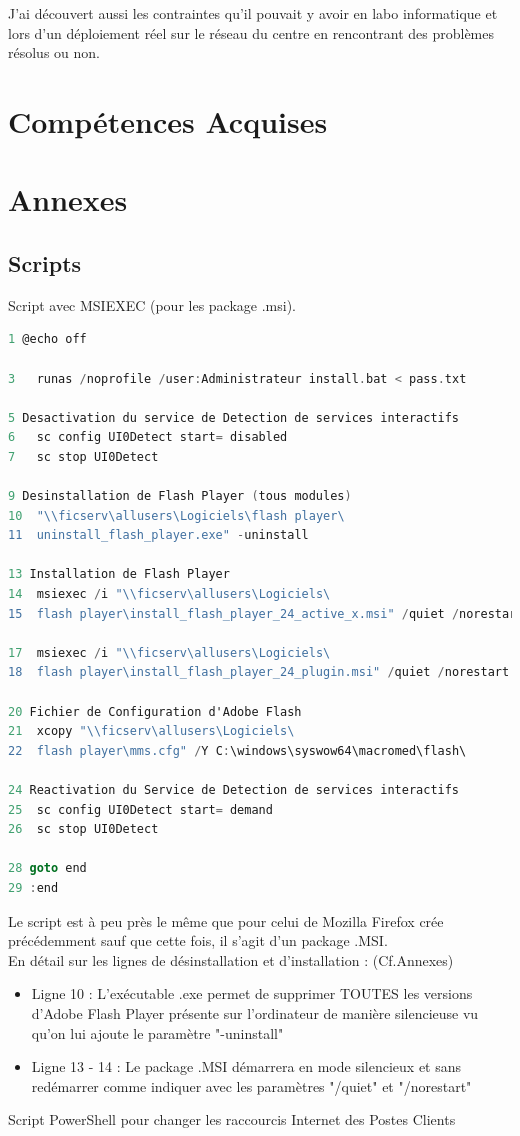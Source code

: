 \documentclass[11pt,a4paper,oneside]{article}
\begin{document}
J'ai découvert aussi les contraintes qu'il pouvait y avoir en labo informatique et lors d'un déploiement réel sur le réseau du centre en rencontrant des problèmes résolus ou non.
\section{Compétences Acquises}
\newpage
\section{Annexes}
\subsection{Scripts}
Script avec MSIEXEC (pour les package .msi).
\begin{lstlisting}[language=C]
1 @echo off

3	runas /noprofile /user:Administrateur install.bat < pass.txt

5 Desactivation du service de Detection de services interactifs
6	sc config UI0Detect start= disabled
7	sc stop UI0Detect

9 Desinstallation de Flash Player (tous modules)
10	"\\ficserv\allusers\Logiciels\flash player\
11	uninstall_flash_player.exe" -uninstall

13 Installation de Flash Player
14	msiexec /i "\\ficserv\allusers\Logiciels\
15	flash player\install_flash_player_24_active_x.msi" /quiet /norestart
	
17	msiexec /i "\\ficserv\allusers\Logiciels\
18	flash player\install_flash_player_24_plugin.msi" /quiet /norestart

20 Fichier de Configuration d'Adobe Flash 
21	xcopy "\\ficserv\allusers\Logiciels\
22	flash player\mms.cfg" /Y C:\windows\syswow64\macromed\flash\ 

24 Reactivation du Service de Detection de services interactifs
25	sc config UI0Detect start= demand
26	sc stop UI0Detect

28 goto end
29 :end
\end{lstlisting}

Le script est à peu près le même que pour celui de Mozilla Firefox crée précédemment sauf que cette fois, il s'agit d'un package .MSI.\\
En détail sur les lignes de désinstallation et d'installation : (Cf.Annexes) \\
\begin{itemize}
\item Ligne 10 : L'exécutable .exe permet de supprimer TOUTES les versions d'Adobe Flash Player présente sur 			l'ordinateur de manière silencieuse vu qu'on lui ajoute le paramètre "-uninstall" \\

\item Ligne 13 - 14 : Le package .MSI démarrera en mode silencieux et sans redémarrer comme indiquer avec les paramètres "/quiet" et "/norestart"
\end{itemize}
\newpage
Script PowerShell pour changer les raccourcis Internet des Postes Clients
\end{document}
